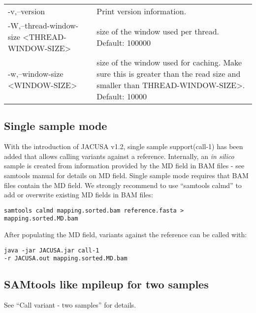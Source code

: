 \documentclass[10pt, a4paper]{article}
\begin{document}
\begin{center}
{\begin{longtable}{p{}p{}}
 -v,--version                                   & Print version information. \\
 -W,--thread-window-size <THREAD-WINDOW-SIZE>   & size of the window used per thread. Default: 100000 \\
 -w,--window-size <WINDOW-SIZE>                 & size of the window used for caching. Make sure this is greater than the read size and smaller than THREAD-WINDOW-SIZE>. Default:
 10000
\end{longtable}}
\end{center}
\subsection{Single sample mode}
With the introduction of JACUSA v1.2, single sample support(call-1) has been added that allows calling variants against a reference. 
Internally, an \textit{in silico} sample is created from information provided by the MD field in BAM files - see samtools manual for details on MD field.
Single sample mode requires that BAM files contain the MD field. We strongly recommend to use ``samtools calmd'' to add or overwrite existing MD fields in BAM files:
\begin{verbatim}
samtools calmd mapping.sorted.bam reference.fasta > mapping.sorted.MD.bam
\end{verbatim}
After populating the MD field, variants against the reference can be called with:
\begin{verbatim} 
java -jar JACUSA.jar call-1 
-r JACUSA.out mapping.sorted.MD.bam
\end{verbatim}
\subsection{SAMtools like mpileup for two samples}
See ``Call variant - two samples'' for details.
\end{document}
